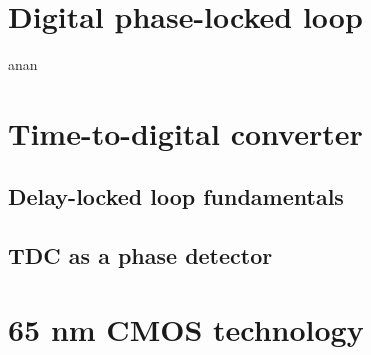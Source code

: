 \section{Digital phase-locked loop}
anan
\section{Time-to-digital converter}
\subsection{Delay-locked loop fundamentals}
\subsection{TDC as a phase detector}

\section{65 nm CMOS technology}
